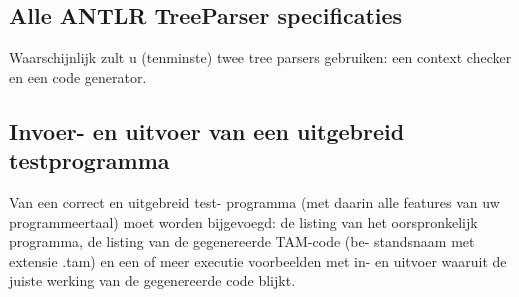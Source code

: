 \documentclass[10pt]{report}
\begin{document}
\subsection{Alle ANTLR TreeParser specificaties}
Waarschijnlijk zult u (tenminste) twee tree parsers
gebruiken: een context checker en een code generator.

\subsection{Invoer- en uitvoer van een uitgebreid testprogramma}
Van een correct en uitgebreid test-
programma (met daarin alle features van uw programmeertaal) moet worden bijgevoegd: de
listing van het oorspronkelijk programma, de listing van de gegenereerde TAM-code (be-
standsnaam met extensie .tam) en een of meer executie voorbeelden met in- en uitvoer
waaruit de juiste werking van de gegenereerde code blijkt.
\end{document}
